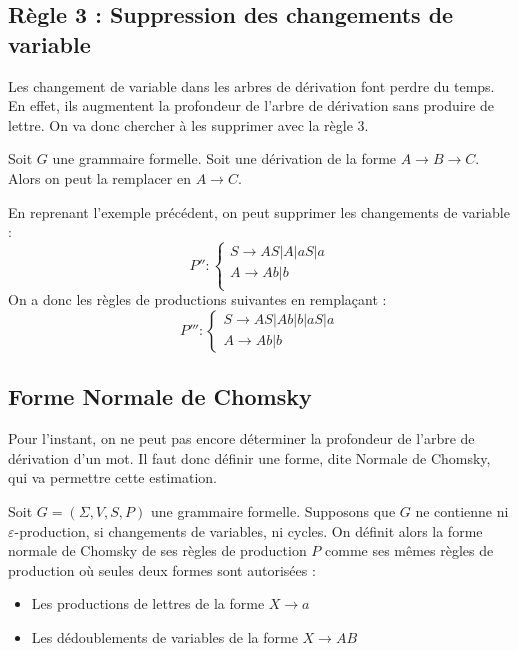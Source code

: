 \subsection{Règle 3 : Suppression des changements de variable}

Les changement de variable dans les arbres de dérivation font perdre du temps. 
En effet, ils augmentent la profondeur de l'arbre de dérivation sans produire de lettre. 
On va donc chercher à les supprimer avec la règle 3. 

\begin{definition}
    Soit $G$ une grammaire formelle. Soit une dérivation de la forme $ A \longrightarrow B \longrightarrow C$. 
    Alors on peut la remplacer en $A \longrightarrow C$. 
\end{definition}

\begin{example}
    En reprenant l'exemple précédent, on peut supprimer les changements de variable : 
    \[ P'' : 
            \begin{cases}
                S \longrightarrow AS | A | aS | a \\ 
                A \longrightarrow Ab | b \\ 
            \end{cases} \] 
    On a donc les règles de productions suivantes en remplaçant :
    \[ P''' : 
            \begin{cases}
                S \longrightarrow AS | Ab | b | aS | a \\ 
                A \longrightarrow Ab | b 
            \end{cases} \] 
\end{example}



\subsection{Forme Normale de Chomsky}

Pour l'instant, on ne peut pas encore déterminer la profondeur de l'arbre de dérivation d'un mot. 
Il faut donc définir une forme, dite Normale de Chomsky, qui va permettre cette estimation. 

\begin{definition}
    Soit $ G = (\Sigma, V, S, P)$ une grammaire formelle. 
    Supposons que $G$ ne contienne ni $\varepsilon$-production, si changements de variables, 
    ni cycles. On définit alors la forme normale de Chomsky de ses règles de production $P$ comme ses 
    mêmes règles de production où seules deux formes sont autorisées : 
    \begin{itemize}
        \item Les productions de lettres de la forme $ X \longrightarrow a$ 
        \item Les dédoublements de variables de la forme $ X \longrightarrow AB$ 
    \end{itemize}
\end{definition}

